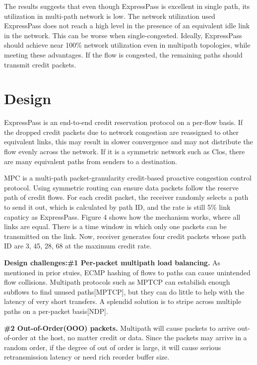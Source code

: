 \documentclass[conference,compsoc]{IEEEtran}
\begin{document}
The results suggests that even though ExpressPass is excellent in single path, its utilization in multi-path network is low. The network utilization used ExpressPass does not reach a high level in the presence of an equivalent idle link in the network. This can be worse when single-congested. Ideally, ExpressPass should achieve near 100\% network utilization even in multipath topologies, while meeting these advantages. If the flow is congested, the remaining paths should transmit credit packets.

\section{Design}
ExpressPass is an end-to-end credit reservation protocol on a per-flow basis. If the dropped credit packets due to network congestion are reassigned to other equivalent links, this may result in slower convergence and may not distribute the flow evenly across the network. If it is a symmetric network such as Clos, there are many equivalent paths from senders to a destination.

MPC is a multi-path packet-granularity credit-based proactive congestion control protocol. Using symmetric routing can ensure data packets follow the reserve path of credit flows. For each credit packet, the receiver randomly selects a path to send it out, which is calculated by path ID, and the rate is still 5\% link capaticy as ExpressPass. Figure 4 shows how the mechanism works, where all links are equal. There is a time window in which only one packets can be transmitted on the link. Now, receiver generates four credit packets whose path ID are 3, 45, 28, 68 at the maximum credit rate.

\textbf{Design challenges:\#1 Per-packet multipath load balancing.} As mentioned in prior stuies, ECMP hashing of flows to paths can cause unintended flow collisions. Multipath protocols such as MPTCP can estabilish enough subflows to find unused paths[MPTCP], but they can do little to help with the latency of very short transfers. A splendid solution is to stripe across multiple paths on a per-packet basis[NDP].

\textbf{\#2 Out-of-Order(OOO) packets.} Multipath will cause packets to arrive out-of-order at the host, no matter credit or data. Since the packets may arrive in a random order, if the degree of out of order is large, it will cause serious retransmission latency or need rich reorder buffer size.
\end{document}
